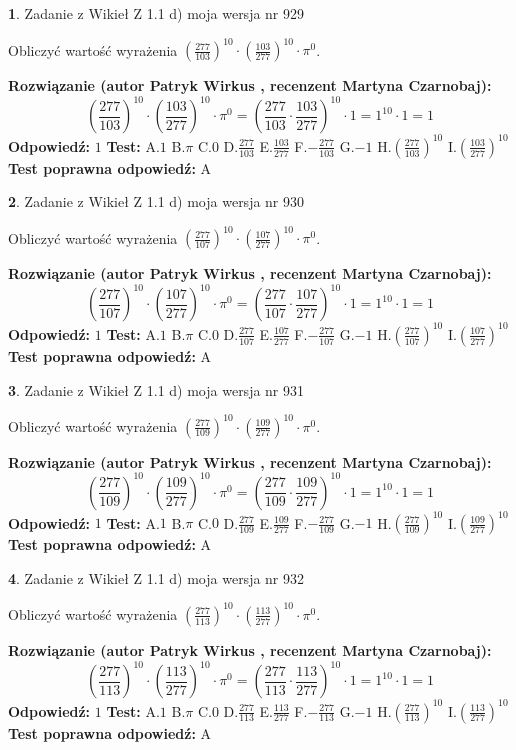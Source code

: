 \documentclass[12pt, a4paper]{article}
\theoremstyle{definition} %
\newtheorem{zad}{}
\newcommand{\zadStart}[1]{\begin{zad}#1\newline}
\newcommand{\zadStop}{\end{zad}}
\newcommand{\rozwStart}[2]{\noindent \textbf{Rozwiązanie (autor #1 , recenzent #2): }\newline}
\newcommand{\rozwStop}{\newline}
\newcommand{\odpStart}{\noindent \textbf{Odpowiedź:}\newline}
\newcommand{\odpStop}{\newline}
\newcommand{\testStart}{\noindent \textbf{Test:}\newline}
\newcommand{\testStop}{\newline}
\newcommand{\kluczStart}{\noindent \textbf{Test poprawna odpowiedź:}\newline}
\newcommand{\kluczStop}{\newline}
\begin{document}
\zadStart{Zadanie z Wikieł Z 1.1 d) moja wersja nr 929}

Obliczyć wartość wyrażenia $(\frac{277}{103})^{10} \cdot (\frac{103}{277})^{10} \cdot \pi^{0}$.
\zadStop
\rozwStart{Patryk Wirkus}{Martyna Czarnobaj}
$$(\frac{277}{103})^{10} \cdot (\frac{103}{277})^{10} \cdot \pi^{0} = (\frac{277}{103} \cdot \frac{103}{277})^{10} \cdot 1 = 1^{10} \cdot 1 = 1$$
\rozwStop
\odpStart
$1$
\odpStop
\testStart
A.$1$ B.$\pi$ C.$0$ D.$\frac{277}{103}$ E.$\frac{103}{277}$
F.$-\frac{277}{103}$ G.$-1$
H.$(\frac{277}{103})^{10}$
I.$(\frac{103}{277})^{10}$
\testStop
\kluczStart
A
\kluczStop



\zadStart{Zadanie z Wikieł Z 1.1 d) moja wersja nr 930}

Obliczyć wartość wyrażenia $(\frac{277}{107})^{10} \cdot (\frac{107}{277})^{10} \cdot \pi^{0}$.
\zadStop
\rozwStart{Patryk Wirkus}{Martyna Czarnobaj}
$$(\frac{277}{107})^{10} \cdot (\frac{107}{277})^{10} \cdot \pi^{0} = (\frac{277}{107} \cdot \frac{107}{277})^{10} \cdot 1 = 1^{10} \cdot 1 = 1$$
\rozwStop
\odpStart
$1$
\odpStop
\testStart
A.$1$ B.$\pi$ C.$0$ D.$\frac{277}{107}$ E.$\frac{107}{277}$
F.$-\frac{277}{107}$ G.$-1$
H.$(\frac{277}{107})^{10}$
I.$(\frac{107}{277})^{10}$
\testStop
\kluczStart
A
\kluczStop



\zadStart{Zadanie z Wikieł Z 1.1 d) moja wersja nr 931}

Obliczyć wartość wyrażenia $(\frac{277}{109})^{10} \cdot (\frac{109}{277})^{10} \cdot \pi^{0}$.
\zadStop
\rozwStart{Patryk Wirkus}{Martyna Czarnobaj}
$$(\frac{277}{109})^{10} \cdot (\frac{109}{277})^{10} \cdot \pi^{0} = (\frac{277}{109} \cdot \frac{109}{277})^{10} \cdot 1 = 1^{10} \cdot 1 = 1$$
\rozwStop
\odpStart
$1$
\odpStop
\testStart
A.$1$ B.$\pi$ C.$0$ D.$\frac{277}{109}$ E.$\frac{109}{277}$
F.$-\frac{277}{109}$ G.$-1$
H.$(\frac{277}{109})^{10}$
I.$(\frac{109}{277})^{10}$
\testStop
\kluczStart
A
\kluczStop



\zadStart{Zadanie z Wikieł Z 1.1 d) moja wersja nr 932}

Obliczyć wartość wyrażenia $(\frac{277}{113})^{10} \cdot (\frac{113}{277})^{10} \cdot \pi^{0}$.
\zadStop
\rozwStart{Patryk Wirkus}{Martyna Czarnobaj}
$$(\frac{277}{113})^{10} \cdot (\frac{113}{277})^{10} \cdot \pi^{0} = (\frac{277}{113} \cdot \frac{113}{277})^{10} \cdot 1 = 1^{10} \cdot 1 = 1$$
\rozwStop
\odpStart
$1$
\odpStop
\testStart
A.$1$ B.$\pi$ C.$0$ D.$\frac{277}{113}$ E.$\frac{113}{277}$
F.$-\frac{277}{113}$ G.$-1$
H.$(\frac{277}{113})^{10}$
I.$(\frac{113}{277})^{10}$
\testStop
\kluczStart
A
\kluczStop
\end{document}
